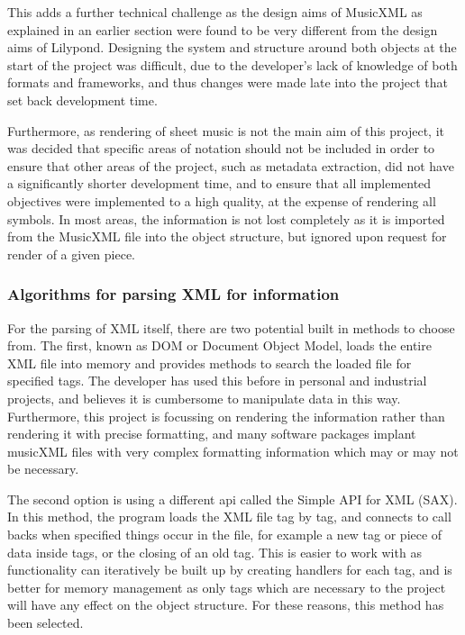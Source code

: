 This adds a further technical challenge as the design aims of MusicXML as explained in an earlier section were found to be very different from the design aims of Lilypond. Designing the system and structure around both objects at the start of the project was difficult, due to the developer's lack of knowledge of both formats and frameworks, and thus changes were made late into the project that set back development time.

Furthermore, as rendering of sheet music is not the main aim of this project, it was decided that specific areas of notation should not be included in order to ensure that other areas of the project, such as metadata extraction, did not have a significantly shorter development time, and to ensure that all implemented objectives were implemented to a high quality, at the expense of rendering all symbols. In most areas, the information is not lost completely as it is imported from the MusicXML file into the object structure, but ignored upon request for render of a given piece.

\subsubsection{Algorithms for parsing XML for information}
For the parsing of XML itself, there are two potential built in methods to choose from. The first, known as DOM or Document Object Model, loads the entire XML file into memory and provides methods to search the loaded file for specified tags. The developer has used this before in personal and industrial projects, and believes it is cumbersome to manipulate data in this way. Furthermore, this project is focussing on rendering the information rather than rendering it with precise formatting, and many software packages implant musicXML files with very complex formatting information which may or may not be necessary\parencite{MusicXMLPresentation}.

The second option is using a different api called the Simple API for XML (SAX). In this method, the program loads the XML file tag by tag, and connects to call backs when specified things occur in the file, for example a new tag or piece of data inside tags, or the closing of an old tag. This is easier to work with as functionality can iteratively be built up by creating handlers for each tag, and is better for memory management as only tags which are necessary to the project will have any effect on the object structure. For these reasons, this method has been selected.

